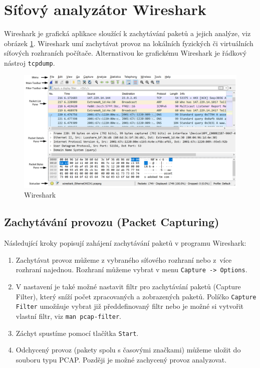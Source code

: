 \section{Síťový analyzátor Wireshark}\label{wireshark}
Wireshark je grafická aplikace sloužící k zachytávání paketů a jejich analýze, viz obrázek \ref{fig:wireshark-layout}. Wireshark umí zachytávat provoz na lokálních fyzických či virtuálních síťových rozhraních počítače. Alternativou ke grafickému Wireshark je řádkový nástroj \texttt{tcpdump}. 

\begin{figure}[h]
  \centering
  \includegraphics[width=170mm]{fig/wireshark-layout.pdf}
  \caption{Wireshark}\label{fig:wireshark-layout}
\end{figure}

\subsection{Zachytávání provozu (Packet Capturing)}
Následující kroky popisují zahájení zachytávání paketů v programu Wireshark:
\begin{enumerate}
  \item Zachytávat provoz můžeme z vybraného síťového rozhraní nebo z~více rozhraní najednou. Rozhraní můžeme vybrat v menu \texttt{Capture -> Options}.
  \item V nastavení je také možné nastavit filtr pro zachytávání paketů (Capture Filter), který sníží počet zpracovaných a zobrazených paketů. Políčko {\tt Capture Filter} umožňuje vybrat již předdefinovaný filtr nebo je možné si vytvořit vlastní filtr, viz {\tt man pcap-filter}.
  \item Záchyt spustíme pomocí tlačítka \texttt{Start}.
  \item Odchycený provoz (pakety spolu s časovými značkami)  můžeme uložit do souboru typu PCAP. Později je možné zachycený provoz analyzovat.
\end{enumerate}

